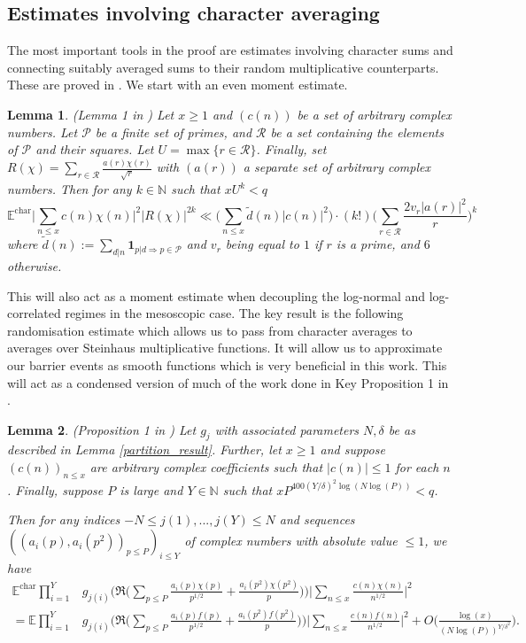 \documentclass[10pt,a4paper]{amsart}
\newtheorem{lemma}{Lemma}
\numberwithin{equation}{section}
\begin{document}
\subsection{Estimates involving character averaging}
The most important tools in the proof are estimates involving character sums and connecting suitably averaged sums to their random multiplicative counterparts. These are proved in \cite{harper2023typicalsizecharacterzeta}. We start with an even moment estimate.
\begin{lemma}
    (Lemma 1 in \cite{harper2023typicalsizecharacterzeta}) Let $x \geq 1$ and $(c(n))$ be a set of arbitrary complex numbers. Let $\mathcal{P}$ be a finite set of primes, and $\mathcal{R}$ be a set containing the elements of $\mathcal{P}$ and their squares. Let $U = \max\{r \in \mathcal{R}\}$. Finally, set $R(\chi) = \sum_{r \in \mathcal{R}}\frac{a(r)\chi(r)}{\sqrt{r}}$ with $(a(r))$ a separate set of arbitrary complex numbers. Then for any $k \in \mathbb{N}$ such that $xU^k < q$
    $$\mathbb{E}^{\text{char}}\big|\sum_{n \leq x}c(n)\chi(n)\big|^2|R(\chi)|^{2k} \ll \big(\sum_{n \leq x}\tilde{d}(n)|c(n)|^2\big)\cdot(k!)\big(\sum_{r \in \mathcal{R}}\frac{2v_r|a(r)|^2}{r}\big)^k$$
    where $\tilde{d}(n) := \sum_{d|n}\mathbf{1}_{p|d \Rightarrow p \in \mathcal{P}}$ and $v_r$ being equal to $1$ if $r$ is a prime, and $6$ otherwise. \label{even_moment}
\end{lemma}
This will also act as a moment estimate when decoupling the log-normal and log-correlated regimes in the mesoscopic case. The key result is the following randomisation estimate which allows us to pass from character averages to averages over Steinhaus multiplicative functions. It will allow us to approximate our barrier events as smooth functions which is very beneficial in this work. This will act as a condensed version of much of the work done in Key Proposition 1 in \cite{harper2019partition}.
\begin{lemma}
     (Proposition 1 in \cite{harper2023typicalsizecharacterzeta}) Let $g_j$ with associated parameters $N,\delta$ be as described in Lemma \ref{partition_result}. Further, let $x \geq 1$ and suppose $(c(n))_{n \leq x}$ are arbitrary complex coefficients such that $|c(n)| \leq 1$ for each $n$. Finally, suppose $P$ is large and $Y \in \mathbb{N}$ such that $xP^{400(Y/\delta)^2\log(N\log(P))} < q$. \par
    Then for any indices $-N \leq j(1),...,j(Y)\leq N$ and sequences $((a_i(p),a_i(p^2))_{p \leq P})_{i \leq Y}$ of complex numbers with absolute value $\leq 1$, we have
    \begin{align*}
        \mathbb{E}^{\text{char}}\prod_{i=1}^Y&g_{j(i)}\big(\Re\big(\sum_{p \leq P}\frac{a_i(p)\chi(p)}{p^{1/2}} + \frac{a_i(p^2)\chi(p^2)}{p}\big)\big)\big|\sum_{n \leq x}\frac{c(n)\chi(n)}{n^{1/2}}\big|^2 \\
        = \mathbb{E}\prod_{i=1}^Y&g_{j(i)}\big(\Re\big(\sum_{p \leq P}\frac{a_i(p)f(p)}{p^{1/2}} + \frac{a_i(p^2)f(p^2)}{p}\big)\big)\big|\sum_{n \leq x}\frac{c(n)f(n)}{n^{1/2}}\big|^2 + O\big(\frac{\log(x)}{(N\log(P))^{Y/\delta^2}}\big).
    \end{align*} \label{randomisation}
\end{lemma}
\end{document}
